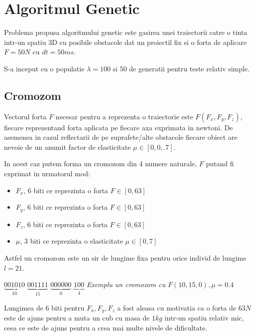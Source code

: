 \chapter{Algoritmul Genetic}

Problema propusa algoritmului genetic este gasirea unei traiectorii catre o tinta intr-un spatiu 3D cu posibile obstacole dat un proiectil fix si o forta de aplicare $F = 50N$ cu $dt=50ms$. 

S-a inceput cu o populatie $\lambda = 100$ si 50 de generatii pentru teste relativ simple.

\section{Cromozom}
Vectorul forta $F$ necesar pentru a reprezenta o traiectorie este $F(F_{x},F_{y},F_{z})$, fiecare reprezentand forta aplicata pe fiecare axa exprimata in newtoni. De asemenea in cazul reflectarii de pe suprafete/alte obstacole fiecare obiect are nevoie de un anumit factor de elasticitate $\mu \in [0,0,.7]$. 

In acest caz putem forma un cromozom din 4 numere naturale, $F$ putand fi exprimat in urmatorul mod:
\begin{itemize}
    \item $F_{x}$, 6 biti ce reprezinta o forta $F \in [0,63]$
    \item $F_{y}$, 6 biti ce reprezinta o forta $F \in [0,63]$
    \item $F_{z}$, 6 biti ce reprezinta o forta $F \in [0,63]$
    \item $\mu$, 3 biti ce reprezinta o elasticitate $\mu \in [0,7]$
\end{itemize}

Astfel un cromozom este un sir de lungime fixa pentru orice individ de lungime $l = 21$.

\begin{center}
    $\underbrace{001010}_{10}$ $\underbrace{001111}_{15}$ $\underbrace{000000}_{0}$ $\underbrace{100}_{4}$ \linebreak \linebreak
    \textit{Exemplu un cromozom cu $F(10,15,0), \mu=0.4$}
\end{center}

Lungimea de 6 biti pentru $F_{x},F_{y},F_{z}$ a fost aleasa cu motivatia ca o forta de $63N$ este de ajuns pentru a muta un cub cu masa de $1kg$ intr-un spatiu relativ mic, ceea ce este de ajuns pentru a crea mai multe nivele de dificultate. 

